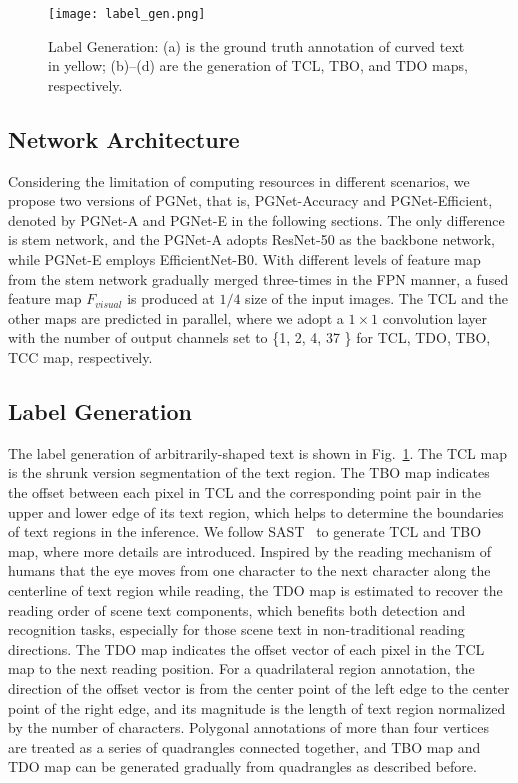 \documentclass[letterpaper]{article} \usepackage{aaai21}  \usepackage{times}  \usepackage{helvet} \usepackage{courier}  \usepackage[hyphens]{url}  \usepackage{graphicx} \urlstyle{rm} \def\UrlFont{\rm}  \usepackage{natbib}  \usepackage{caption} \usepackage{bm}
\begin{document}
\begin{figure}
    \centering
    \texttt{[image: label\_gen.png]}
    \caption{Label Generation: (a) is the ground truth annotation of curved text in yellow; (b)--(d) are the generation of TCL, TBO, and TDO maps, respectively.}
    \label{fig:datagen}
\end{figure}


\subsection{Network Architecture}
Considering the limitation of computing resources in different scenarios, we propose two versions of PGNet, that is, PGNet-Accuracy and PGNet-Efficient, denoted by PGNet-A and PGNet-E in the following sections. The only difference is stem network, and the PGNet-A adopts ResNet-50 as the backbone network, while PGNet-E employs EfficientNet-B0. With different levels of feature map from the stem network gradually merged three-times in the FPN manner, a fused feature map $F_{visual}$ is produced at $1/4$ size of the input images. The TCL and the other maps are predicted in parallel, where we adopt a $1\times 1$ convolution layer with the number of output channels set to \{1, 2, 4, 37 \} for TCL, TDO, TBO, TCC map, respectively. 

\subsection{Label Generation}
The label generation of arbitrarily-shaped text is shown in Fig.~\ref{fig:datagen}. The TCL map is the shrunk version segmentation of the text region. The TBO map indicates the offset between each pixel in TCL and the corresponding point pair in the upper and lower edge of its text region, which helps to determine the boundaries of text regions in the inference. We follow SAST~\cite{wang2019single} to generate TCL and TBO map, where more details are introduced. Inspired by the reading mechanism of humans that the eye moves from one character to the next character along the centerline of text region while reading, the TDO map is estimated to recover the reading order of scene text components, which benefits both detection and recognition tasks, especially for those scene text in non-traditional reading directions. The TDO map indicates the offset vector of each pixel in the TCL map to the next reading position. For a quadrilateral region annotation, the direction of the offset vector is from the center point of the left edge to the center point of the right edge, and its magnitude is the length of text region normalized by the number of characters. Polygonal annotations of more than four vertices are treated as a series of quadrangles connected together, and TBO map and TDO map can be generated gradually from quadrangles as described before.
\end{document}
